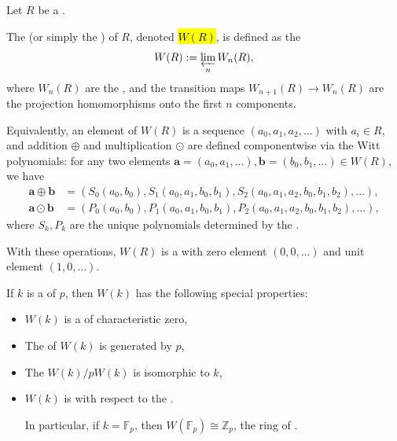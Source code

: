 \begin{definition}\label{definition:witt_ring_of_a_commutative_ring}
Let $R$ be a .

The  (or simply the ) of $R$, denoted \hl{$W(R)$}, is defined as the 
$$
    W(R) := \varprojlim_{n} W_n(R),
$$
where $W_n(R)$ are the , and the transition maps $W_{n+1}(R) \to W_n(R)$ are the projection homomorphisms onto the first $n$ components.

Equivalently, an element of $W(R)$ is a sequence $(a_0, a_1, a_2, \dots)$ with $a_i \in R$, and addition $\oplus$ and multiplication $\odot$ are defined componentwise via the Witt polynomials: for any two elements $\mathbf{a} = (a_0, a_1, \dots), \mathbf{b} = (b_0, b_1, \dots) \in W(R)$, we have
\begin{align*}
    \mathbf{a} \oplus \mathbf{b} &= (S_0(a_0, b_0), S_1(a_0, a_1, b_0, b_1), S_2(a_0, a_1, a_2, b_0, b_1, b_2), \dots), \\
    \mathbf{a} \odot \mathbf{b} &= (P_0(a_0, b_0), P_1(a_0, a_1, b_0, b_1), P_2(a_0, a_1, a_2, b_0, b_1, b_2), \dots),
\end{align*}
where $S_k, P_k$ are the unique polynomials determined by the .

With these operations, $W(R)$ is a  with zero element $(0, 0, \dots)$ and unit element $(1, 0, \dots)$.

If $k$ is a  of  $p$, then $W(k)$ has the following special properties:
\begin{itemize}
    \item $W(k)$ is a  of characteristic zero,
    \item The  of $W(k)$ is generated by $p$,
    \item The  $W(k)/pW(k)$ is isomorphic to $k$,
    \item $W(k)$ is  with respect to the .

    In particular, if $k = \mathbb{F}_p$, then $W(\mathbb{F}_p) \cong \mathbb{Z}_p$, the ring of .
\end{itemize}
\end{definition}
